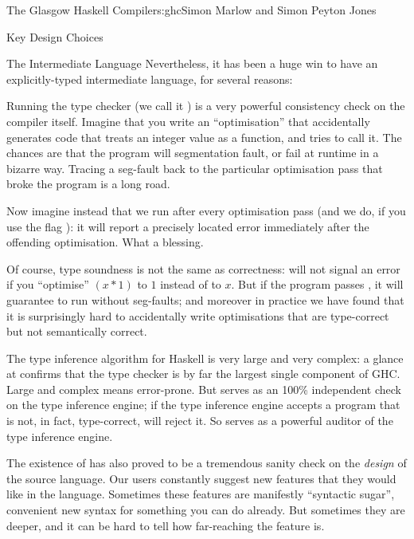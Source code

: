 \begin{aosachapter}{The Glasgow Haskell Compiler}{s:ghc}{Simon Marlow and Simon Peyton Jones}
\begin{aosasect1}{Key Design Choices}
\begin{aosasect2}{The Intermediate Language}
Nevertheless, it has been a huge win to have an explicitly-typed
intermediate language, for several reasons:

\begin{aosaitemize}

\item Running the  type checker (we call it ) is a very
  powerful consistency check on the compiler itself.  Imagine that you
  write an ``optimisation'' that accidentally generates code that
  treats an integer value as a function, and tries to call it.  The
  chances are that the program will segmentation fault, or fail at
  runtime in a bizarre way. Tracing a seg-fault back to the particular
  optimisation pass that broke the program is a long road.

  Now imagine instead that we run  after every optimisation
  pass (and we do, if you use the flag ): it will
  report a precisely located error immediately after the offending
  optimisation.  What a blessing.

  Of course, type soundness is not the same as correctness: 
  will not signal an error if you ``optimise'' $(x*1)$ to $1$ instead
  of to $x$.  But if the program passes , it will guarantee to
  run without seg-faults; and moreover in practice we have found that
  it is surprisingly hard to accidentally write optimisations that are
  type-correct but not semantically correct.

  \item The type inference algorithm for Haskell is very large and
    very complex: a glance at  confirms that the
    type checker is by far the largest single component of GHC.  Large
    and complex means error-prone.  But  serves as an 100\%
    independent check on the type inference engine; if the type
    inference engine accepts a program that is not, in fact,
    type-correct,  will reject it. So  serves as a
    powerful auditor of the type inference engine.

\item The existence of  has also proved to be a tremendous
  sanity check on the \emph{design} of the source language.  Our users
  constantly suggest new features that they would like in the
  language. Sometimes these features are manifestly ``syntactic
  sugar'', convenient new syntax for something you can do already. But
  sometimes they are deeper, and it can be hard to tell how
  far-reaching the feature is.


\end{aosaitemize}
\end{aosasect2}
\end{aosasect1}
\end{aosachapter}
